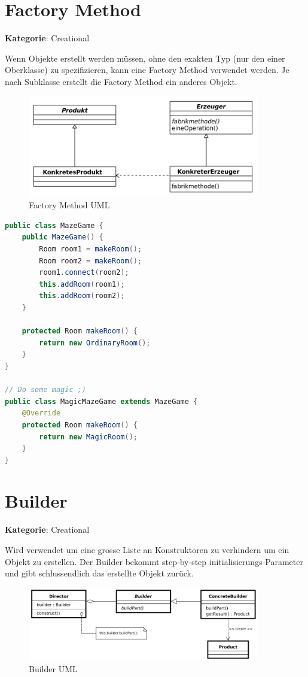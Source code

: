 \section{Factory Method}
\textbf{Kategorie}: Creational

Wenn Objekte erstellt werden müssen, ohne den exakten Typ (nur den einer Oberklasse) zu spezifizieren, kann eine Factory Method verwendet werden.
Je nach Subklasse erstellt die Factory Method ein anderes Objekt.

\begin{figure}[H]
	\centering
	\includegraphics[width=0.9\textwidth]{content/gof/images/03-factory-method.png}
	\caption{Factory Method UML}
\end{figure}

\begin{lstlisting}[language=Java, caption={Factory Method}]
public class MazeGame {
	public MazeGame() {
		Room room1 = makeRoom();
		Room room2 = makeRoom();
		room1.connect(room2);
		this.addRoom(room1);
		this.addRoom(room2);
	}

	protected Room makeRoom() {
		return new OrdinaryRoom();
	}
}

// Do some magic ;)
public class MagicMazeGame extends MazeGame {
	@Override
	protected Room makeRoom() {
		return new MagicRoom();
	}
}
\end{lstlisting}

\section{Builder}

\textbf{Kategorie}: Creational

Wird verwendet um eine grosse Liste an Konstruktoren zu verhindern um ein Objekt zu erstellen. Der Builder bekommt step-by-step initialisierungs-Parameter und gibt schlussendlich das erstellte Objekt zurück.

\begin{figure}[H]
	\centering
	\includegraphics[width=0.9\textwidth]{content/gof/images/04-builder-uml.png}
	\caption{Builder UML}
\end{figure}


